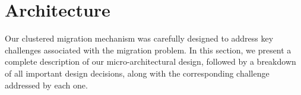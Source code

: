 \section{Architecture}
\label{sec:Architecture}

Our clustered migration mechanism was carefully designed to address key challenges associated with the migration problem. In this section, we present a complete description of our micro-architectural design, followed by a breakdown of all important design decisions, along with the corresponding challenge addressed by each one.

